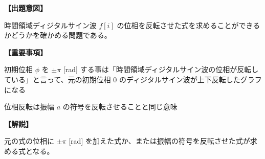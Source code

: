 \noindent \textbf{【出題意図】}

\noindent 時間領域ディジタルサイン波 $f[i]$ の位相を反転させた式を求めることができるかどうかを確かめる問題である。

\vspace{1em}
\noindent \textbf{【重要事項】}

\bigskip
\noindent  初期位相 $\phi$ を $\pm\pi$ [rad] する事は「時間領域ディジタルサイン波の位相が反転している」と言って、元の初期位相 $0$ のディジタルサイン波が上下反転したグラフになる

\bigskip
\noindent  位相反転は振幅 $a$ の符号を反転させることと同じ意味


\vspace{1em}
\noindent \textbf{【解説】}

\noindent 元の式の位相に $\pm\pi$ [rad] を加えた式か、または振幅の符号を反転させた式が求める式となる。
